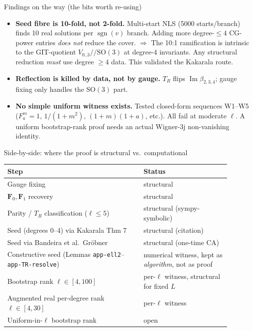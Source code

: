 \documentclass[10pt,aspectratio=169]{beamer}
\newcommand{\SO}{\mathrm{SO}}
\newcommand{\im}{\operatorname{Im}}
\newcommand{\F}{\mathbf{F}}
\DeclareMathOperator{\sgn}{sgn}
\begin{document}
\begin{frame}{Findings on the way (the bits worth re-using)}
\begin{itemize}
  \item \textbf{Seed fibre is 10-fold, not 2-fold.}
        Multi-start NLS (5000 starts/branch) finds 10 real solutions per
        $\sgn(v)$ branch. Adding more degree-$\le 4$ CG-power entries
        \emph{does not} reduce the cover.
        $\Rightarrow$ The 10:1 ramification is intrinsic to the GIT-quotient
        $V_{0..3}//\SO(3)$ at degree-4 invariants. Any structural reduction
        \emph{must} use degree $\ge 4$ data. This validated the Kakarala route.
  \item \textbf{Reflection is killed by data, not by gauge.}
        $T_R$ flips $\im\beta_{2,3,4}$; gauge fixing only handles the
        $\SO(3)$ part.
  \item \textbf{No simple uniform witness exists.}
        Tested closed-form sequences W1--W5 ($F_a^m = 1$, $1/(1+m^2)$,
        $(1+m)(1+a)$, etc.). All fail at moderate $\ell$. A uniform
        bootstrap-rank proof needs an actual Wigner-3j non-vanishing identity.
\end{itemize}
\end{frame}

\begin{frame}{Side-by-side: where the proof is structural vs.\ computational}
\centering\small
\begin{tabular}{p{0.55\linewidth}p{0.35\linewidth}}
\toprule
Step & Status \\
\midrule
Gauge fixing & structural \\
$\F_0, \F_1$ recovery & structural \\
Parity / $T_R$ classification ($\ell \le 5$) & structural (sympy-symbolic) \\
Seed (degrees 0--4) via Kakarala Thm 7 & structural (citation) \\
Seed via Bandeira et al.\ Gröbner & structural (one-time CA) \\
Constructive seed (Lemmas \texttt{app-ell2}--\texttt{app-TR-resolve}) & numerical witness, kept as \emph{algorithm}, not as proof \\
Bootstrap rank $\ell \in [4,100]$ & per-$\ell$ witness, structural for fixed $L$ \\
Augmented real per-degree rank $\ell \in [4, 30]$ & per-$\ell$ witness \\
Uniform-in-$\ell$ bootstrap rank & \alert{open} \\
\bottomrule
\end{tabular}
\end{frame}
\end{document}
